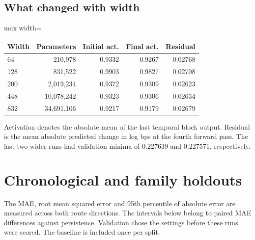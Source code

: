 \documentclass[11pt,oneside,openany]{book}
\begin{document}
\section*{What changed with width}
\begin{center}\footnotesize\sffamily\setlength{\tabcolsep}{3.5pt}\renewcommand{\arraystretch}{1.2}
\begin{adjustbox}{max width=\linewidth}\begin{tabular}{@{}lrrrr@{}}\toprule
Width & Parameters & Initial act. & Final act. & Residual \\ \midrule
64 & 210,978 & 0.9332 & 0.9267 & 0.02768 \\
128 & 831,522 & 0.9903 & 0.9827 & 0.02708 \\
200 & 2,019,234 & 0.9372 & 0.9309 & 0.02623 \\
448 & 10,078,242 & 0.9323 & 0.9306 & 0.02634 \\
832 & 34,691,106 & 0.9217 & 0.9179 & 0.02679 \\
\bottomrule\end{tabular}\end{adjustbox}\end{center}
Activation denotes the absolute mean of the last temporal block output. Residual is the mean absolute predicted change in log bps at the fourth forward pass. The last two wider runs had validation minima of 0.227639 and 0.227571, respectively.

\chapter{Chronological and family holdouts}
The MAE, root mean squared error and 95th percentile of absolute error are measured across both route directions. The intervals below belong to paired MAE differences against persistence. Validation chose the settings before these runs were scored. The baseline is included once per split.
\end{document}

